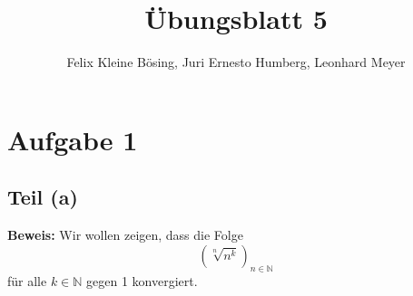 \documentclass[11pt]{article}
\begin{document}
\title{Übungsblatt 5}
\author{Felix Kleine Bösing, Juri Ernesto Humberg, Leonhard Meyer}
\maketitle

\section*{Aufgabe 1}

\subsection*{Teil (a)}

\textbf{Beweis:} Wir wollen zeigen, dass die Folge
\[
\left( \sqrt[n]{n^k} \right)_{n \in \mathbb{N}}
\]
für alle \( k \in \mathbb{N} \) gegen 1 konvergiert.
\end{document}
